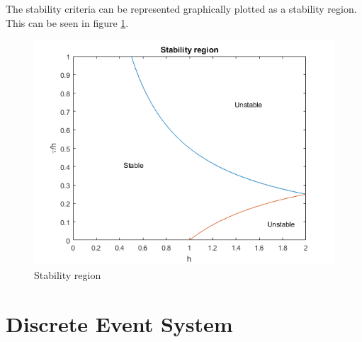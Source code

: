 \documentclass[12pt,a4paper]{article}
\begin{document}
The stability criteria can be represented graphically plotted as a
stability region. This can be seen in figure \ref{fig:stabilityRegion}.
\begin{figure}[H]
    \begin{center}
      \includegraphics[scale=0.5]{stabilityRegion.png}
      \caption{Stability region}
      \label{fig:stabilityRegion}
    \end{center}
\end{figure}




\section{Discrete Event System}
\end{document}
